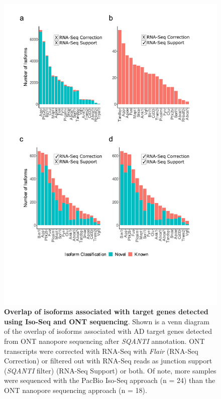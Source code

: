 \begin{figure}[htp]
	\centering
	\includegraphics[page=2,trim={0cm 20cm 0cm 0cm},clip,scale = 0.65]{Figures/ONTTargetedTranscriptome_BioinformaticsPipeline}
	\captionsetup{width=0.95\textwidth,singlelinecheck=off}
	\caption[Overlap of isoforms associated with target genes detected using Iso-Seq and ONT sequencing]%
	{\textbf{Overlap of isoforms associated with target genes detected using Iso-Seq and ONT sequencing}. Shown is a venn diagram of the overlap of isoforms associated with AD target genes detected from ONT nanopore sequencing after \textit{SQANTI} annotation. ONT transcripts were corrected with RNA-Seq with \textit{Flair} (RNA-Seq Correction) or filtered out with RNA-Seq reads as junction support (\textit{SQANTI} filter) (RNA-Seq Support) or both. Of note, more samples were sequenced with the PacBio Iso-Seq approach (n = 24) than the ONT nanopore sequencing approach (n = 18).   
	}
	\label{fig:ONT_isoseq_comparisons}
\end{figure}

